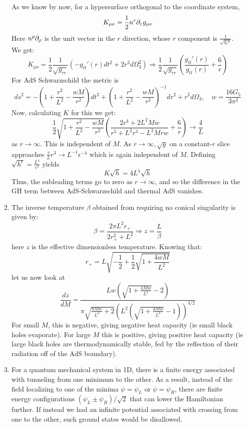 \documentclass[11pt, class=article, crop=false]{standalone}
\begin{document}
\begin{enumerate}
	As we know by now, for a hypersurface orthogonal to the coordinate system,
	\[
		K_{\mu \nu} = \frac12 n^r \partial_r g_{\mu \nu}
	\]
	Here $n^\rho \partial_\rho$ is the unit vector in the $r$ direction, whose $r$ component is $\frac{1}{\sqrt{g_rr}}$. We get:
	\[
		K_{\mu \nu} = \frac12 \frac{1}{\sqrt{g_{rr}}} (-g_{tt}'(r) dt^2 + 2 r^3 d\Omega_3^2) \Rightarrow  \frac12 \frac{1}{\sqrt{g_{rr}}} \left(\frac{g_{tt}'(r)}{g_{tt}(r)} + \frac{6}{r} \right)
	\]
	For AdS Schwarzschild the metric is
	\[
		ds^2 = -\left(1 + \frac{r^2}{L^2} - \frac{w M}{r^2} \right) dt^2 + \left(1 + \frac{r^2}{L^2} - \frac{w M}{r^2} \right)^{-1} dr^2 +  r^2 d\Omega_3, \quad w = \frac{16 G_5}{3 \pi^2}
	\]
	Now, calculating $K$ for this we get:
	\[
		\frac12 \sqrt{1 + \frac{r^2}{L^2} - \frac{w M}{r^2}} \left(\frac{2 r^4 + 2 L^2 M w}{r^5 + L^2 r^3 - L^2 M r w} + \frac6r \right) \to \frac4L
	\]
	as $r \to \infty$. This is independent of $M$. As $r \to \infty, \sqrt{g}$ on a constant-$r$ slice approaches $\frac{r}{L} r^3 \to L^{-1} \epsilon^{-4}$ which is again independent of $M$. Defining $\sqrt{h^\epsilon} = \frac{L^4}{\epsilon^4}$ yields
	\[
		K \sqrt h = 4 L^4 \sqrt h
	\]
	Thus, the subleading terms go to zero as $r \to \infty$, and so the difference in the GH term between AdS-Schwarzschild and thermal AdS vanishes. 
	
	\item The inverse temperature $\beta$ obtained from requiring no conical singularity is given by:
	\[
		\beta = \frac{2 \pi L^2 r_+}{2 r_+^2 + L^2} \Rightarrow z = \frac{L}{\beta}
	\]
	here $z$ is the effective dimensionless temperature. Knowing that:
	\[
		r_+ = L \sqrt{-\frac12 + \frac12 \sqrt{1 + \frac{4 w M}{L^2}}}
	\]
	let us now look at
	\[
		\frac{dz}{dM} = \frac{L w \left(\sqrt{1 + \frac{4 M w}{L^2}}-2\right)}{\pi  \sqrt{\frac{8 M w}{L^2}+2} \left(L^2 \left(\sqrt{1 + \frac{4 M w}{L^2}}-1\right)\right)^{3/2}}
	\]
	For small $M$, this is negative, giving negative heat capacity (ie small black holes evaporate). For large $M$ this is positive, giving positive heat capacity (ie large black holes are thermodynamically stable, fed by the reflection of their radiation off of the AdS boundary).
	
	\item For a quantum mechanical system in 1D, there is a finite energy associated with tunneling from one minimum to the other. As a result, instead of the field localizing to one of the minima $\psi=\psi_L$ or $\psi = \psi_R$, there are finite energy configurations $(\psi_L \pm \psi_R)/\sqrt{2}$ that can lower the Hamiltonian further. If instead we had an infinite potential associated with crossing from one to the other, such ground states would be disallowed.
	

\end{enumerate}
\end{document}
